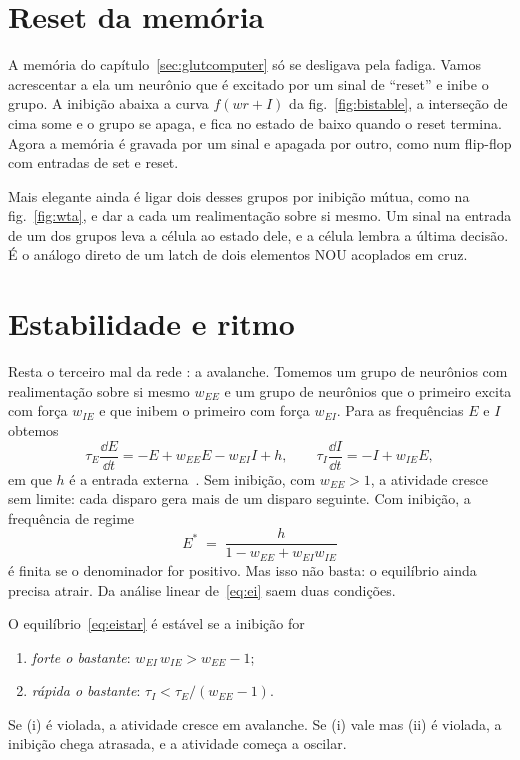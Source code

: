 \section{Reset da memória}

A memória do capítulo~\ref{sec:glutcomputer} só se desligava pela fadiga. Vamos acrescentar a ela um neurônio  que é excitado por um sinal de ``reset'' e inibe o grupo. A inibição abaixa a curva $f(wr+I)$ da fig.~\ref{fig:bistable}, a interseção de cima some e o grupo se apaga, e fica no estado de baixo quando o reset termina. Agora a memória é gravada por um sinal e apagada por outro, como num flip-flop com entradas de set e reset.

Mais elegante ainda é ligar dois desses grupos por inibição mútua, como na fig.~\ref{fig:wta}, e dar a cada um realimentação sobre si mesmo. Um sinal na entrada de um dos grupos leva a célula ao estado dele, e a célula lembra a última decisão. É o análogo direto de um latch de dois elementos NOU acoplados em cruz.

\section{Estabilidade e ritmo}

Resta o terceiro mal da rede : a avalanche. Tomemos um grupo de neurônios  com realimentação sobre si mesmo $w_{EE}$ e um grupo de neurônios  que o primeiro excita com força $w_{IE}$ e que inibem o primeiro com força $w_{EI}$. Para as frequências $E$ e $I$ obtemos
\begin{equation}
\tau_E\frac{\dd E}{\dd t} = -E + w_{EE}E - w_{EI}I + h, \qquad
\tau_I\frac{\dd I}{\dd t} = -I + w_{IE}E ,
\label{eq:ei}
\end{equation}
em que $h$ é a entrada externa~\cite{WilsonCowan1972}. Sem inibição, com $w_{EE}>1$, a atividade cresce sem limite: cada disparo gera mais de um disparo seguinte. Com inibição, a frequência de regime
\begin{equation}
E^* \;=\; \frac{h}{1-w_{EE}+w_{EI}w_{IE}}
\label{eq:eistar}
\end{equation}
é finita se o denominador for positivo. Mas isso não basta: o equilíbrio ainda precisa atrair. Da análise linear de~\eqref{eq:ei} saem duas condições.

\begin{keyblock}
\begin{proposition}
\label{prop:ei}
O equilíbrio~\eqref{eq:eistar} é estável se a inibição for
\begin{enumerate}
\item[(i)] \emph{forte o bastante}: $w_{EI}\,w_{IE} > w_{EE}-1$;
\item[(ii)] \emph{rápida o bastante}: $\tau_I < \tau_E/(w_{EE}-1)$.
\end{enumerate}
Se (i) é violada, a atividade cresce em avalanche. Se (i) vale mas (ii) é violada, a inibição chega atrasada, e a atividade começa a oscilar.
\end{proposition}
\end{keyblock}


